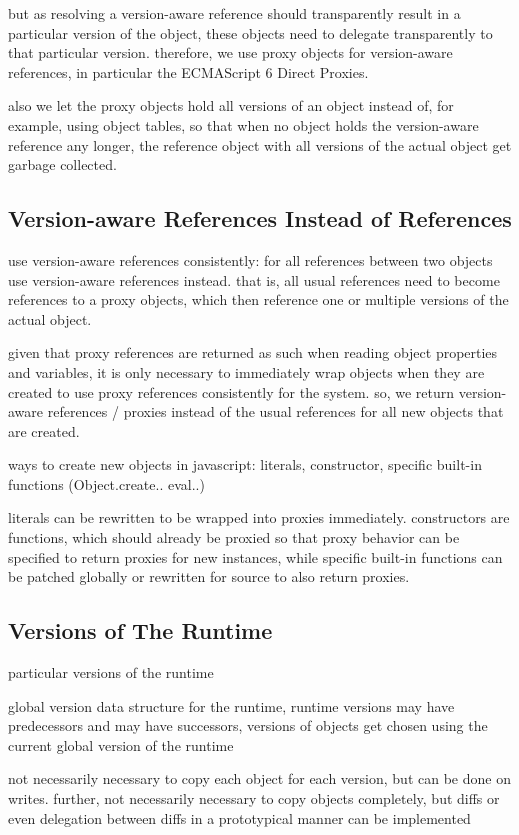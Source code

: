 but as resolving a version-aware reference should transparently result in a particular version of the object, these objects need to delegate transparently to that particular version.
therefore, we use proxy objects for version-aware references, in particular the ECMAScript 6 Direct Proxies.

also we let the proxy objects hold all versions of an object instead of, for example, using object tables, so that when no object holds the version-aware reference any longer, the reference object with all versions of the actual object get garbage collected.



\subsection{Version-aware References Instead of References}

use version-aware references consistently:
for all references between two objects use version-aware references instead. that is, all usual references need to become references to a proxy objects, which then reference one or multiple versions of the actual object.

given that proxy references are returned as such when reading object properties and variables, it is only necessary to immediately wrap objects when they are created to use proxy references consistently for the system. so, we return version-aware references / proxies instead of the usual references for all new objects that are created.

ways to create new objects in javascript: literals, constructor, specific built-in functions (Object.create.. eval..)

literals can be rewritten to be wrapped into proxies immediately. constructors are functions, which should already be proxied so that proxy behavior can be specified to return proxies for new instances, while specific built-in functions can be patched globally or rewritten for source to also return proxies.



\subsection{Versions of The Runtime}

particular versions of the runtime

global version data structure for the runtime, runtime versions may have predecessors and may have successors, versions of objects get chosen using the current global version of the runtime

not necessarily necessary to copy each object for each version, but can be done on writes. further, not necessarily necessary to copy objects completely, but diffs or even delegation between diffs in a prototypical manner can be implemented
